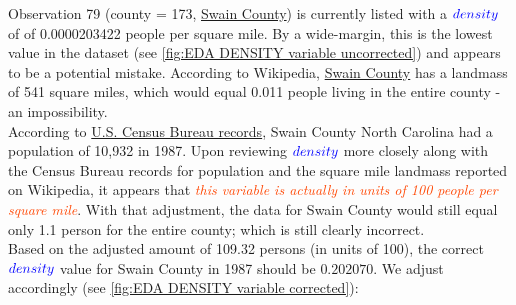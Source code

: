 Observation 79 (county = 173, \href{http://www.swaincountync.gov/}{Swain County}) is currently listed with a $\textcolor{Blue}{density}$ of of 0.0000203422 people per square mile.  By a wide-margin, this is the lowest value in the dataset (see \ref{fig:EDA DENSITY variable uncorrected}) and appears to be a potential mistake.  According to Wikipedia, \href{https://en.wikipedia.org/wiki/Swain_County,_North_Carolina}{Swain County} has a landmass of 541 square miles, which would equal 0.011 people living in the entire county - an impossibility.  \\

According to \href{https://www.google.com/publicdata/explore?ds=kf7tgg1uo9ude_&met_y=population&idim=county:37173&hl=en&dl=en}{U.S. Census Bureau records}, Swain County North Carolina had a population of 10,932 in 1987.  Upon reviewing $\textcolor{Blue}{density}$ more closely along with the Census Bureau records for population and the square mile landmass reported on Wikipedia, it appears that \textcolor{OrangeRed}{\textit{this variable is actually in units of 100 people per square mile}}.  With that adjustment, the data for Swain County would still equal only 1.1 person for the entire county; which is still clearly incorrect.\\

Based on the adjusted amount of 109.32 persons (in units of 100), the correct $\textcolor{Blue}{density}$ value for Swain County in 1987 should be $0.202070$.  We adjust accordingly (see \ref{fig:EDA DENSITY variable corrected}):\\

